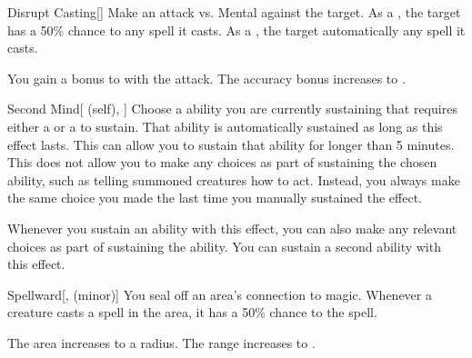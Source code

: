 \lowercase{\hypertarget{spell:Disrupt Casting}{}}\label{spell:Disrupt Casting}
\begin{freeability}[Rank 4]{\hypertarget{spell:Disrupt Casting}{Disrupt Casting}}[]
Make an attack vs. Mental against the target.
\hit As a , the target has a 50\% chance to  any spell it casts.
\crit As a , the target automatically  any spell it casts.

\rankline
{} You gain a  bonus to  with the attack.
 The accuracy bonus increases to .

\end{freeability}
\vspace{0.25em}



\lowercase{\hypertarget{spell:Second Mind}{}}\label{spell:Second Mind}
\begin{attuneability}[Rank 4]{\hypertarget{spell:Second Mind}{Second Mind}}[ (self), ]
Choose a  ability you are currently sustaining that requires either a  or a  to sustain.
That ability is automatically sustained as long as this effect lasts.
This can allow you to sustain that ability for longer than 5 minutes.
This does not allow you to make any choices as part of sustaining the chosen ability, such as telling summoned creatures how to act.
Instead, you always make the same choice you made the last time you manually sustained the effect.

\rankline
{} Whenever you sustain an ability with this effect, you can also make any relevant choices as part of sustaining the ability.
 You can sustain a second ability with this effect.

\end{attuneability}
\vspace{0.25em}



\lowercase{\hypertarget{spell:Spellward}{}}\label{spell:Spellward}
\begin{freeability}[Rank 4]{\hypertarget{spell:Spellward}{Spellward}}[,  (minor)]
You seal off an area's connection to magic.
Whenever a creature casts a spell in the area, it has a 50\% chance to  the spell.

\rankline
{} The area increases to a \areamed radius.
 The range increases to \rnglong.

\end{freeability}
\vspace{0.25em}



